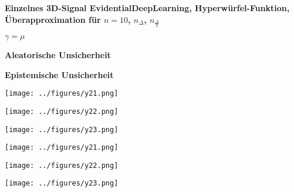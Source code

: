 \begin{otherlanguage}{ngerman}

\begin{samepage}
\begin{minipage}{\textwidth}

\noindent\textbf{Einzelnes 3D-Signal \gls{EvidentialDeepLearning}, Hyperwürfel-Funktion,
Überapproximation für $n=10$, $n_{\Delta}$, $n_{\frac{\Delta}{2}}$}


\begin{minipage}{0.05\textwidth}\vspace{0.5cm}\end{minipage}%
\begin{minipage}{0.3\textwidth}\centering \textbf{$\gamma=\mu$}\end{minipage}%
\begin{minipage}{0.3\textwidth}\centering \textbf{Aleatorische Unsicherheit}\end{minipage}%
\begin{minipage}{0.3\textwidth}\centering \textbf{Epistemische Unsicherheit}\end{minipage}

\vspace{0.125cm}

\begin{minipage}{0.05\textwidth}\centering{}\end{minipage}%
\begin{minipage}{0.3\textwidth}\centering\texttt{[image: ../figures/y21.png]}\end{minipage}%
\begin{minipage}{0.3\textwidth}\centering\texttt{[image: ../figures/y22.png]}\end{minipage}%
\begin{minipage}{0.3\textwidth}\centering\texttt{[image: ../figures/y23.png]}\end{minipage}

\vspace{0.125cm}

\begin{minipage}{0.05\textwidth}\centering{}\end{minipage}%
\begin{minipage}{0.3\textwidth}\centering\texttt{[image: ../figures/y21.png]}\end{minipage}%
\begin{minipage}{0.3\textwidth}\centering\texttt{[image: ../figures/y22.png]}\end{minipage}%
\begin{minipage}{0.3\textwidth}\centering\texttt{[image: ../figures/y23.png]}\end{minipage}


\end{minipage}
\end{samepage}
\end{otherlanguage}
